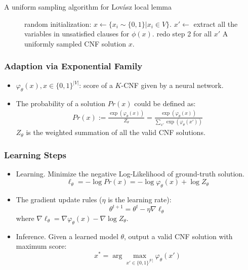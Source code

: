 \documentclass[numfooter,aspectratio=169]{beamer}
\begin{document}
\begin{frame}{A uniform sampling algorithm for Lov\'asz local lemma}
\begin{figure}
	\begin{algorithmic}[1]
    \State random initialization: $x\leftarrow \{ x_i\sim\{0,1\}| x_i\in V\}$.
    \State $x'\leftarrow$ extract all the variables in unsatisfied clauses for $\phi(x)$.
    \State redo step 2 for all $x'$
    \EndWhile
    \State \Return A uniformly sampled CNF solution $x$.
\EndProcedure
	\end{algorithmic}
\end{figure}
\end{frame}


\begin{frame}
\frametitle{Adaption via Exponential Family}
\begin{itemize}
        \item $\varphi_{\theta}(x),x\in\{0,1\}^{|V|}$: score of a $K$-CNF given by a neural network.
\item The probability of a solution $Pr(x)$ could be defined as:
\begin{equation}\label{eq:prob}
\begin{aligned}
Pr(x):=\frac{\exp({\varphi_{\theta}(x)})}{Z_\theta}=\frac{\exp({\varphi_{\theta}(x)})}{\sum_{x'}\exp({\varphi_{\theta}(x')})}
\end{aligned}
\end{equation}
$Z_\theta$ is the weighted summation of all the valid CNF solutions.
\end{itemize}

\end{frame}

\begin{frame}
\frametitle{Learning Steps}
\begin{itemize}
\item Learning.  Minimize the negative Log-Likelihood of ground-truth solution.
$$\ell_{\theta}=-\log Pr(x)=-\log \varphi_{\theta}(x) +\log Z_\theta$$
\item The gradient update rules ($\eta$ is the learning rate):
 $$\theta^{t+1} =\theta^t -\eta \nabla \ell_{\theta}$$
 where $\nabla \ell_\theta= \nabla \varphi_{\theta}(x) -\nabla\log Z_{\theta}$.
\item Inference. Given a  learned model $\theta$, output a valid CNF solution with maximum score:
$$x^*= \arg\max_{x'\in \{0,1\}^{|V|}}\varphi_{\theta}(x')$$
\end{itemize}
\end{frame}
\end{document}
